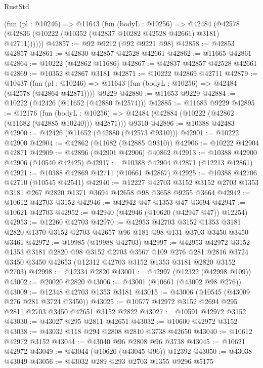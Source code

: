 \begin{lexlean}{RustStd}
\begin{coremodule}
      (fun (pl : @10246) =>
      @11643
        (fun (bodyL : @10256) =>
        @42484 (@42578 (@42836 (@10222 (@10352 (@42837 @10282 @42528 @42661) @3181) @42711))))))
@42857 := @92 @9212 (@92 @9221 @98)
@42858 := @42853 @42857
@42861 := @42830 @42857 @42528 @42661
@42862 := @11665 @42861
@42864 := @10222 (@42862 @11686)
@42867 := @42837 @42857 @42528 @42661
@42869 := @10352 @42867 @3181
@42871 := @10222 @42869 @42711
@42879 := @10437
    (fun (pl : @10246) => @11643 (fun (bodyL : @10256) => @42484 (@42578 (@42864 @42871))))
    @9229
@42880 := @11653 @9229
@42884 := @10222 (@42426 (@11652 (@42880 @42574)))
@42885 := @11683 @9229
@42895 := @12176
    (fun (bodyL : @10256) => @42484 (@42884 (@10222 (@42862 (@11682 (@42885 @10240))) @42871)))
    @9310
@42896 := @10388 @42483
@42900 := @42426 (@11652 (@42880 (@42573 @9310)))
@42901 := @10222 @42900
@42904 := @42862 (@11682 (@42885 @9310))
@42906 := @10222 @42904 @42871
@42909 := @42896 (@42901 @42906) @40862
@42913 := @10388 @42900 @42906 (@10540 @42425)
@42917 := @10388 @42904 @42871 (@12213 @42861)
@42921 := @10388 @42869 @42711 (@10661 @42867)
@42925 := @10388 @42706 @42710 (@10545 @42541)
@42940 := @12227
    @42703
    @3152
    @3152
    @2703
    @1353
    @3181
    @267
    @2820
    @1371
    @3694
    @42658
    @98
    @3658
    @9255
    @3664
@42942 := @10612 @42703 @3152
@42946 := @42942 @47 @1353 @47 @3694
@42947 := @10621 @42703
@42952 := @42940 (@42946 (@10620 (@42947 @47)) @12254)
@42953 := @12260 @42703
@42970 := @42953
    @42703
    @3152
    @1353
    @3181
    @2820
    @1370
    @3152
    @2703
    @42657
    @96
    @181
    @98
    @131
    @3703
    @3450
    @3450
    @3461
@42972 := @19985 (@19988 @42703)
@42997 := @42953
    @42972
    @3152
    @1353
    @3181
    @2820
    @98
    @3152
    @2703
    @3567
    @109
    @276
    @281
    @2816
    @3724
    @3450
    @3450
    @42653
    (@12312 @42703 @3152 @1353 @3181 @2820 @3152 @2703)
@42998 := @12334 @2820
@43001 := @42997 (@12322 (@42998 @109))
@43002 := @20020 @2820
@43006 := @43001 (@10661 (@43002 @98 @276))
@43009 := @12348 @42703 @1353 @3181
@43015 := @43006 (@10545 (@43009 @276 @281 @3724 @3450))
@43025 := @10577 @42972 @3152 @2694 @295 @2811 @2703 @3450 @42651 @3152 @2822
@43027 := @10591 @42972 @3152
@43030 := @43027 @295 @2811 @42651
@43032 := @10600 @42972 @3152
@43038 := @43032 @118 @294 @2808 @2810 @3738 @42650
@43040 := @10612 @42972 @3152
@43044 := @43040 @96 @2808 @96 @3738
@43045 := @10621 @42972
@43049 := @43044 (@10620 (@43045 @96)) @12392
@43050 := @43038 @43049
@43056 := @43032 @289 @293 @2703 @1355 @9296 @5175

\end{coremodule}
\end{lexlean}
